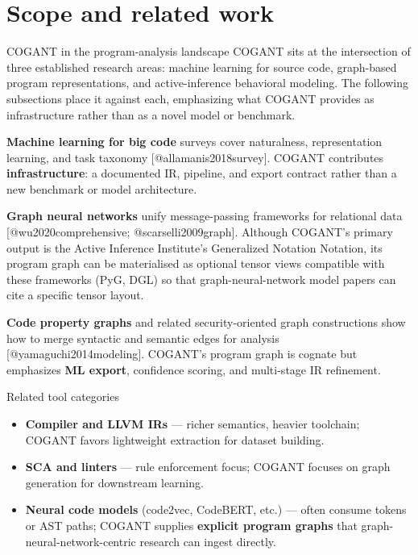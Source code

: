 \documentclass[
  ignorenonframetext,
]{beamer}
\author{\texorpdfstring{}{}}
\date{}
\providecommand{\tightlist}{%
  \setlength{\itemsep}{0pt}\setlength{\parskip}{0pt}}
\begin{document}
\section{Scope and related work}\label{scope-and-related-work}

\begin{frame}{COGANT in the program-analysis landscape}
\protect{}\label{cogant-in-the-program-analysis-landscape}
COGANT sits at the intersection of three established research areas:
machine learning for source code, graph-based program representations,
and active-inference behavioral modeling. The following subsections
place it against each, emphasizing what COGANT provides as
infrastructure rather than as a novel model or benchmark.

\textbf{Machine learning for big code} surveys cover naturalness,
representation learning, and task taxonomy {[}@allamanis2018survey{]}.
COGANT contributes \textbf{infrastructure}: a documented IR, pipeline,
and export contract rather than a new benchmark or model architecture.

\textbf{Graph neural networks} unify message-passing frameworks for
relational data {[}@wu2020comprehensive; @scarselli2009graph{]}.
Although COGANT's primary output is the Active Inference Institute's
Generalized Notation Notation, its program graph can be materialised as
optional tensor views compatible with these frameworks (PyG, DGL) so
that graph-neural-network model papers can cite a specific tensor
layout.

\textbf{Code property graphs} and related security-oriented graph
constructions show how to merge syntactic and semantic edges for
analysis {[}@yamaguchi2014modeling{]}. COGANT's program graph is cognate
but emphasizes \textbf{ML export}, confidence scoring, and multi-stage
IR refinement.
\end{frame}

\begin{frame}{Related tool categories}
\protect{}\label{related-tool-categories}
\begin{itemize}
\tightlist
\item
  \textbf{Compiler and LLVM IRs} --- richer semantics, heavier
  toolchain; COGANT favors lightweight extraction for dataset building.
\item
  \textbf{SCA and linters} --- rule enforcement focus; COGANT focuses on
  graph generation for downstream learning.
\item
  \textbf{Neural code models} (code2vec, CodeBERT, etc.) --- often
  consume tokens or AST paths; COGANT supplies \textbf{explicit program
  graphs} that graph-neural-network-centric research can ingest
  directly.
\end{itemize}
\end{frame}
\end{document}
